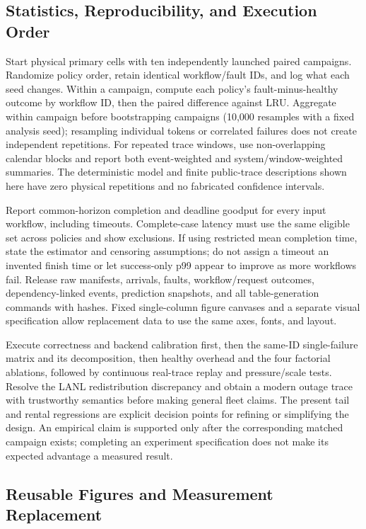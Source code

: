 \documentclass[sigplan,10pt,anonymous,nonacm]{acmart}
\begin{document}
\FloatBarrier
\subsection{Statistics, Reproducibility, and Execution Order}
\label{sec:eval-plan}

Start physical primary cells with ten independently launched paired
campaigns. Randomize policy order, retain identical workflow/fault IDs,
and log what each seed changes. Within a campaign, compute each policy's
fault-minus-healthy outcome by workflow ID, then the paired difference
against LRU. Aggregate within campaign before bootstrapping campaigns
(10,000 resamples with a fixed analysis seed); resampling individual
tokens or correlated failures does not create independent repetitions.
For repeated trace windows, use non-overlapping calendar blocks and
report both event-weighted and system/window-weighted summaries.
The deterministic model and finite public-trace descriptions shown here
have zero physical repetitions and no fabricated confidence intervals.

Report common-horizon completion and deadline goodput for every input
workflow, including timeouts. Complete-case latency must use the same
eligible set across policies and show exclusions. If using restricted
mean completion time, state the estimator and censoring assumptions;
do not assign a timeout an invented finish time or let success-only
p99 appear to improve as more workflows fail. Release raw manifests,
arrivals, faults, workflow/request outcomes, dependency-linked events,
prediction snapshots, and all table-generation commands with hashes.
Fixed single-column figure canvases and a separate visual specification
allow replacement data to use the same axes, fonts, and layout.

Execute correctness and backend calibration first, then the same-ID
single-failure matrix and its decomposition, then healthy overhead and
the four factorial ablations, followed by continuous real-trace replay
and pressure/scale tests. Resolve the LANL redistribution discrepancy
and obtain a modern outage trace with trustworthy semantics before
making general fleet claims. The present tail and rental regressions
are explicit decision points for refining or simplifying the design.
An empirical claim is supported only after the corresponding matched
campaign exists; completing an experiment specification does not make
its expected advantage a measured result.

\FloatBarrier
\subsection{Reusable Figures and Measurement Replacement}
\end{document}
